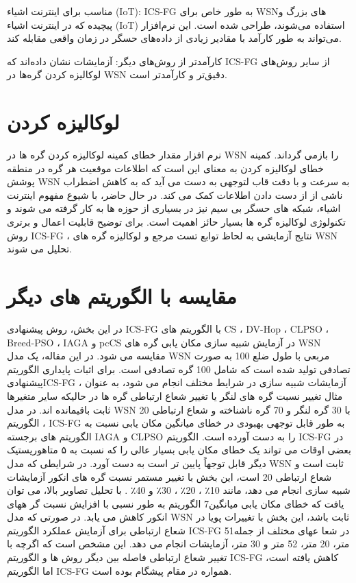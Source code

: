 \documentclass{CSICC2020}
\begin{document}
مناسب برای اینترنت اشیاء (IoT): ICS-FG به طور خاص برای WSN‌های بزرگ و پیچیده که در اینترنت اشیاء (IoT) استفاده می‌شوند، طراحی شده است. این نرم‌افزار می‌تواند به طور کارآمد با مقادیر زیادی از داده‌های حسگر در زمان واقعی مقابله کند.

کارآمدتر از روش‌های دیگر: آزمایشات نشان داده‌اند که ICS-FG از سایر روش‌های لوکالیزه کردن گره‌ها در WSN دقیق‌تر و کارآمدتر است.



\section{لوکالیزه کردن}
نرم افزار مقدار خطای کمینه لوکالیزه کردن گره ها در WSN را بازمی گرداند. کمینه خطای لوکالیزه کردن به معنای این است که اطلاعات موقعیت هر گره در منطقه پوشش WSN به سرعت و با دقت قاب لتوجهی به دست می آید که به کاهش اضطراب ناشی از از دست دادن اطلاعات کمک می کند. در حال حاضر، با شیوع مفهوم اینترنت اشیاء، شبکه های حسگر بی سیم نیز در بسیاری از حوزه ها به کار گرفته می شوند و تکنولوژی لوکالیزه گره ها بسیار حائز اهمیت است. برای توضیح قابلیت اعمال و برتری روش ICS-FG ، نتایج آزمایشی به لحاظ توابع تست مرجع و لوکالیزه گره های WSN تحلیل می شوند.

\section{مقایسه با الگوریتم های دیگر}

در این بخش، روش پیشنهادی ICS-FG با الگوریتم های CS ، DV-Hop ، CLPSO  ،  Breed-PSO ، IAGA  و  pcCS در آزمایش شبیه سازی مکان یابی گره های WSN مقایسه می شود. در این مقاله، یک مدل WSN  مربعی با طول ضلع 100 به صورت تصادفی تولید شده است که شامل 100 گره تصادفی است. 
برای اثبات پایداری الگوریتم پیشنهادیICS-FG ، آزمایشات شبیه سازی در شرایط مختلف انجام می شود، به عنوان مثال تغییر نسبت گره های لنگر یا تغییر شعاع ارتباطی گره ها در حالیکه سایر متغیرها ثابت باقیمانده اند.
در مدل WSN با 30 گره لنگر و 70 گره ناشناخته و شعاع ارتباطی 20 ، الگوریتم ICS-FG  به طور قابل توجهی بهبودی در خطای میانگین مکان یابی نسبت به الگوریتم های برجسته IAGA و CLPSO را به دست آورده است. الگوریتم ICS-FG در بعضی اوقات می تواند یک خطای مکان یابی بسیار عالی را که نسبت به ۵ متاهوریستیک دیگر قابل توجهاً پایین تر است به دست آورد. در شرایطی که مدل WSN  ثابت است و شعاع ارتباطی 20 است، این بخش با تغییر مستمر نسبت گره های انکور آزمایشات شبیه سازی انجام می دهد، مانند 10٪ ، 20٪ ، 30٪ و 40٪ . با تحلیل تصاویر بالا، می توان یافت که خطای مکان یابی میانگین7 الگوریتم به طور نسبی با افزایش نسبت گر ههای انکور کاهش می یابد. 
در صورتی که مدل WSN ثابت باشد، این بخش با تغییرات پویا در شعاع ارتباطی برای آزمایش عملکرد الگوریتم ICS-FG  در شعا عهای مختلف از جمله51 متر، 20 متر، 52 متر و 30 متر، آزمایشات انجام می دهد. این مشخص است که اگرچه با تغییر شعاع ارتباطی فاصله بین دیگر روش ها و الگوریتم ICS-FG کاهش یافته است، اما الگوریتم ICS-FG  همواره در مقام پیشگام بوده است.
\end{document}
